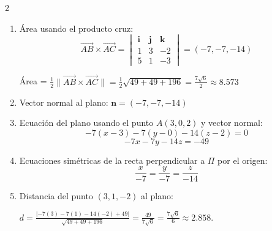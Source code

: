 \begin{example}
\begin{myproof}
\begin{multicols}{2}
\begin{enumerate}[$(a)$]
\item Área usando el producto cruz:
$$\overrightarrow{AB} \times \overrightarrow{AC} = \begin{vmatrix}
\mathbf{i} & \mathbf{j} & \mathbf{k} \\
1 & 3 & -2 \\
5 & 1 & -3
\end{vmatrix} = (-7, -7, -14)$$

Área = $\frac{1}{2}\|\overrightarrow{AB} \times \overrightarrow{AC}\| = \frac{1}{2}\sqrt{49 + 49 + 196} = \boxed{\frac{7\sqrt{6}}{2}} \approx 8.573$

\item Vector normal al plano: $\boxed{\mathbf{n} = (-7, -7, -14)}$

\item Ecuación del plano usando el punto $A(3,0,2)$ y vector normal:
$$-7(x - 3) - 7(y - 0) - 14(z - 2) = 0$$
$$\boxed{-7x - 7y - 14z = -49}$$

\item Ecuaciones simétricas de la recta perpendicular a $\Pi$ por el origen:
$$\boxed{\frac{x}{-7} = \frac{y}{-7} = \frac{z}{-14}}$$

\item Distancia del punto $(3,1,-2)$ al plano:


$d = \frac{|-7(3) - 7(1) - 14(-2) + 49|}{\sqrt{49 + 49 + 196}} = \frac{49}{7\sqrt{6}} = \boxed{\frac{7\sqrt{6}}{6}} \approx 2.858.$
\end{enumerate}
\end{multicols}
\end{myproof}
\end{example}


